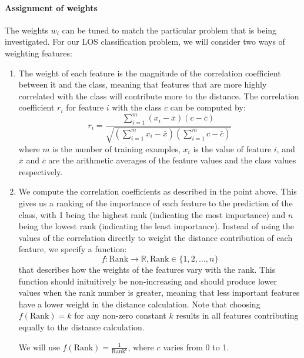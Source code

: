 \paragraph{Assignment of weights}
The weights $w_i$ can be tuned to match the particular problem that is being
investigated. For our LOS classification problem, we will consider two ways
of weighting features:
\begin{enumerate}
\item The weight of each feature is the magnitude of the correlation
coefficient
between it and the class, meaning that features that are more highly correlated
with the class will contribute more to the distance. The correlation
coefficient $r_i$ for feature $i$ with the class $c$ can be computed by:
\begin{equation*}
r_i = \dfrac{\sum_{i=1}^m (x_i-\bar{x})(c-\bar{c})}{\sqrt{(\sum_{i=1}^m x_i-\bar{x})(\sum_{i=1}^m c-\bar{c})}}
\end{equation*}
where $m$ is the number of training examples, $x_i$ is the value of feature
$i$, and $\bar{x}$ and $\bar{c}$ are the arithmetic averages of the feature
values and the class values respectively. 
\item We compute the correlation coefficients as described in the point above.
This gives us a ranking of the importance of each feature to the prediction of
the class, with 1 being the highest rank (indicating the most importance) and
$n$ being the lowest rank (indicating the least importance).
Instead of using the values of the correlation directly to weight
the distance contribution of each feature, we specify a function:
\begin{equation*}
f : \mathrm{Rank} \rightarrow \mathbb{R}, \mathrm{Rank} \in \{1,2,\ldots,n\}
\end{equation*}
that describes
how the weights of the features vary with the rank. This function should
inituitively be non-increasing and should produce lower values when the rank
number is greater, meaning that less important features have a lower weight
in the distance calculation.
Note that choosing $f(\mathrm{Rank}) = k$ for any non-zero constant $k$
results in all features contributing equally to the distance calculation.

\noindent We will use $f(\mathrm{Rank}) = \frac{1}{\mathrm{Rank}^c}$, where
$c$ varies from 0 to 1.
\end{enumerate}

